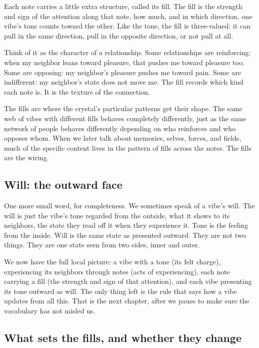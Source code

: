 Each note carries a little extra structure, called its fill. The fill is the strength and sign of the attention along that note, how much, and in which direction, one vibe's tone counts toward the other. Like the tone, the fill is three-valued: it can pull in the same direction, pull in the opposite direction, or not pull at all.

Think of it as the character of a relationship. Some relationships are reinforcing: when my neighbor leans toward pleasure, that pushes me toward pleasure too. Some are opposing: my neighbor's pleasure pushes me toward pain. Some are indifferent: my neighbor's state does not move me. The fill records which kind each note is. It is the texture of the connection.

The fills are where the crystal's particular patterns get their shape. The same web of vibes with different fills behaves completely differently, just as the same network of people behaves differently depending on who reinforces and who opposes whom. When we later talk about memories, selves, forces, and fields, much of the specific content lives in the pattern of fills across the notes. The fills are the wiring.

\subsection{Will: the outward face}

One more small word, for completeness. We sometimes speak of a vibe's will. The will is just the vibe's tone regarded from the outside, what it shows to its neighbors, the state they read off it when they experience it. Tone is the feeling from the inside. Will is the same state as presented outward. They are not two things. They are one state seen from two sides, inner and outer.

We now have the full local picture: a vibe with a tone (its felt charge), experiencing its neighbors through notes (acts of experiencing), each note carrying a fill (the strength and sign of that attention), and each vibe presenting its tone outward as will. The only thing left is the rule that says how a vibe updates from all this. That is the next chapter, after we pause to make sure the vocabulary has not misled us.

\subsection{What sets the fills, and whether they change}

